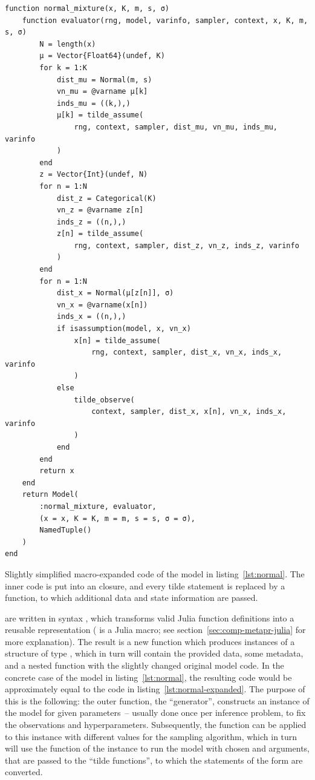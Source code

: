 \begin{lstfloat}
  \begin{lstlisting}[style=lstfloat]
function normal_mixture(x, K, m, s, σ)
    function evaluator(rng, model, varinfo, sampler, context, x, K, m, s, σ)
        N = length(x)
        μ = Vector{Float64}(undef, K)
        for k = 1:K
            dist_mu = Normal(m, s)
            vn_mu = @varname μ[k]
            inds_mu = ((k,),)
            μ[k] = tilde_assume(
                rng, context, sampler, dist_mu, vn_mu, inds_mu, varinfo
            )
        end
        z = Vector{Int}(undef, N)
        for n = 1:N
            dist_z = Categorical(K)
            vn_z = @varname z[n]
            inds_z = ((n,),)
            z[n] = tilde_assume(
                rng, context, sampler, dist_z, vn_z, inds_z, varinfo
            )
        end
        for n = 1:N
            dist_x = Normal(μ[z[n]], σ)
            vn_x = @varname(x[n])
            inds_x = ((n,),)
            if isassumption(model, x, vn_x)
                x[n] = tilde_assume(
                    rng, context, sampler, dist_x, vn_x, inds_x, varinfo
                )
            else
                tilde_observe(
                    context, sampler, dist_x, x[n], vn_x, inds_x, varinfo
                )
            end
        end
        return x
    end
    return Model(
        :normal_mixture, evaluator, 
        (x = x, K = K, m = m, s = s, σ = σ), 
        NamedTuple()
    )
end
\end{lstlisting}
  \caption{Slightly simplified macro-expanded code of the model in listing~\ref{lst:normal}.  The
    inner code is put into an \protect{} closure, and every tilde statement is
    replaced by a \protect{} function, to which additional data and state information
    are passed.\label{lst:normal-expanded}}
\end{lstfloat}
\setlength{\parskip}{0pt}

 are written in \dppljl{} syntax \parencite{tarek2020dynamicppl},
which transforms valid Julia function definitions into a reusable representation ( is
a Julia macro; see section~\ref{sec:comp-metapr-julia} for more explanation).  The result is a new
function which produces instances of a structure of type , which in turn will contain
the provided data, some metadata, and a nested function with the slightly changed original model
code. In the concrete case of the model in listing~\ref{lst:normal}, the resulting code would be
approximately equal to the code in listing~\ref{lst:normal-expanded}.  The purpose of this is the
following: the outer function, the \enquote{generator}, constructs an instance of the model for
given parameters~-- usually done once per inference problem, to fix the observations and
hyperparameters.  Subsequently, the  function can be applied to this instance with
different values for the sampling algorithm, which in turn will use the  function
of the instance to run the model with chosen  and  arguments, that are
passed to the \enquote{tilde functions}, to which the statements of the form  are
converted.

